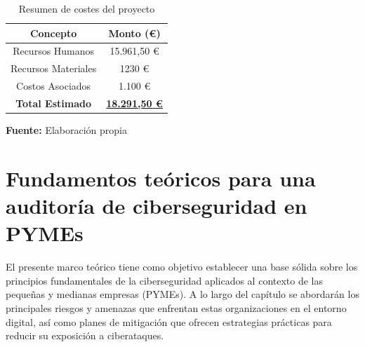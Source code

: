 \documentclass[a4paper, 11pt]{article}
\begin{document}
\begin{table}[H]
\caption{Resumen de costes del proyecto}
\centering
\renewcommand{\arraystretch}{1.5}
\begin{tabular}{|c|c|}
\hline
\textbf{Concepto} & \textbf{Monto (€)} \\ \hline
Recursos Humanos & 15.961,50 € \\ \hline
Recursos Materiales & 1230 € \\ \hline
Costos Asociados & 1.100 € \\ \hline
\textbf{Total Estimado} & \underline{\textbf{18.291,50 €}} \\ \hline
\end{tabular}
\begin{flushleft}\centering
    \footnotesize \textbf{Fuente:} Elaboración propia
\end{flushleft}   
\label{tab:resumen_costes}
\end{table}



\clearpage































\par\vspace{0.5cm}

\section{Fundamentos teóricos para una auditoría de ciberseguridad en PYMEs}
\par\vspace{0.5cm}


El presente marco teórico tiene como objetivo establecer una base sólida sobre los principios fundamentales de la ciberseguridad aplicados al contexto de las pequeñas y medianas empresas (PYMEs). A lo largo del capítulo se abordarán los principales riesgos y amenazas que enfrentan estas organizaciones en el entorno digital, así como planes de mitigación que ofrecen estrategias prácticas para reducir su exposición a ciberataques.
\end{document}
